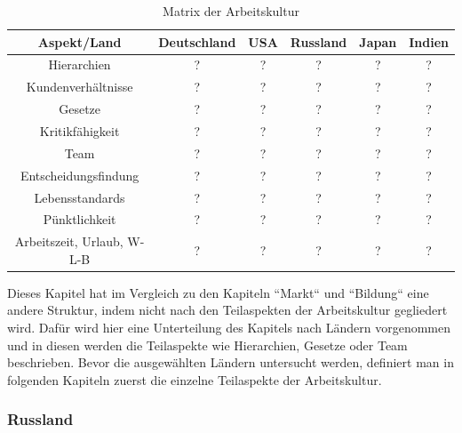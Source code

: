 \begin{table}[htp]
\begin{tabular}{|c|c|c|c|c|c|}
\hline  Aspekt/Land& Deutschland & USA & Russland & Japan & Indien \\ 
\hline 	Hierarchien  & ? & ? & ? & ? & ? \\ 
\hline  Kundenverhältnisse& ? & ? & ? & ? & ? \\ 
\hline  Gesetze& ? & ? & ? & ? & ?  \\ 
\hline  Kritikfähigkeit& ? & ? & ? & ? & ? \\ 
\hline  Team& ? & ? & ? & ? & ?\\ 
\hline  Entscheidungsfindung& ? & ? & ? & ? & ?  \\ 
\hline  Lebensstandards& ? & ? & ? & ? & ? \\ 
\hline  Pünktlichkeit& ? & ? & ? & ? & ?\\ 
\hline  Arbeitszeit, Urlaub, W-L-B& ? & ? & ? & ? & ?\\ 
\hline 
\end{tabular} 
\caption{Matrix der Arbeitskultur}
\end{table}
%
Dieses Kapitel hat im Vergleich zu den Kapiteln ``Markt`` und ``Bildung`` eine andere Struktur, indem nicht nach den Teilaspekten der Arbeitskultur gegliedert wird. Dafür wird hier eine Unterteilung des Kapitels nach Ländern vorgenommen und in diesen werden die Teilaspekte wie Hierarchien, Gesetze oder Team beschrieben.
Bevor die ausgewählten Ländern untersucht werden, definiert man in folgenden Kapiteln zuerst die einzelne Teilaspekte der Arbeitskultur.

	\subsubsection{Russland}
	
